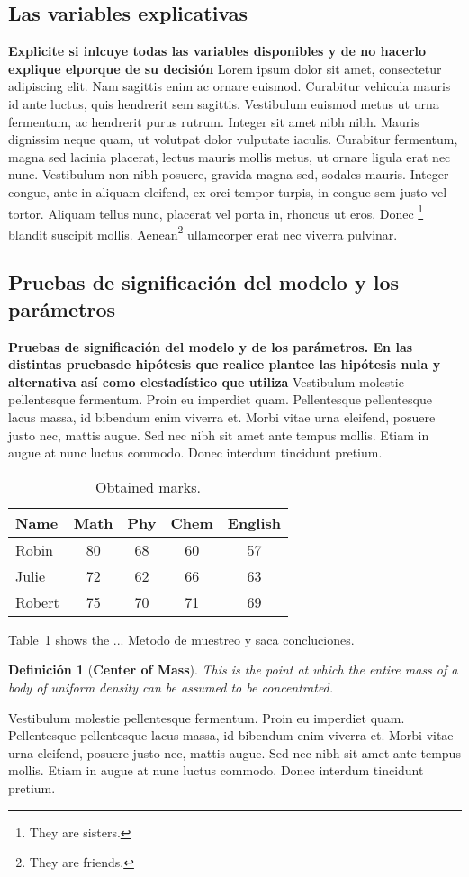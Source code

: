 \documentclass[a4paper,12pt,twocolumn]{article}
\newtheorem{dfn}{Definición}
\begin{document}
\subsection{Las variables explicativas }
\textbf{Explicite si inlcuye todas las variables disponibles y de no hacerlo explique elporque de su decisión} 
Lorem ipsum dolor sit amet, consectetur adipiscing elit. Nam sagittis enim ac ornare euismod. Curabitur vehicula mauris id ante luctus, quis hendrerit sem sagittis. Vestibulum euismod metus ut urna fermentum, ac hendrerit purus rutrum. Integer sit amet nibh nibh. Mauris dignissim neque quam, ut volutpat dolor vulputate iaculis. Curabitur fermentum, magna sed lacinia placerat, lectus mauris mollis metus, ut ornare ligula erat nec nunc. Vestibulum non nibh posuere, gravida magna sed, sodales mauris. Integer congue, ante in aliquam eleifend, ex orci tempor turpis, in congue sem justo vel tortor. Aliquam tellus nunc, placerat vel porta in, rhoncus ut eros. Donec \footnote{They are sisters.} blandit suscipit mollis. Aenean\footnote{They are
friends.\label{fn:friends}} ullamcorper erat nec viverra pulvinar. 
\subsection{Pruebas de significación del modelo y los parámetros }
\textbf{Pruebas de significación del modelo y de los parámetros. En las distintas pruebasde hipótesis que  realice plantee las hipótesis nula y alternativa  así  como  elestadístico que utiliza}
Vestibulum molestie pellentesque fermentum. Proin eu imperdiet quam. Pellentesque pellentesque lacus massa, id bibendum enim viverra et. Morbi vitae urna eleifend, posuere justo nec, mattis augue. Sed nec nibh sit amet ante tempus mollis. Etiam in augue at nunc luctus commodo. Donec interdum tincidunt pretium. 
\begin{table}[!hbt]
\centering
\caption{Obtained marks.}
\label{tab-marks}
\begin{tabular}{|l|c|c|c|c|}
\hline Name & Math & Phy & Chem & English\\
\hline Robin & 80 & 68 & 60 & 57\\
\hline Julie & 72 & 62 & 66 & 63\\
\hline Robert & 75 & 70 & 71 & 69\\
\hline
\end{tabular}
\end{table}
%
Table~\ref{tab-marks} shows the ...
Metodo de muestreo y saca concluciones. 

\begin{dfn}[\bf Center of Mass]\label{dfn-cm}
This is the point at which the entire mass of
a body of uniform density can be assumed to
be concentrated.
\end{dfn}
Vestibulum molestie pellentesque fermentum. Proin eu imperdiet quam. Pellentesque pellentesque lacus massa, id bibendum enim viverra et. Morbi vitae urna eleifend, posuere justo nec, mattis augue. Sed nec nibh sit amet ante tempus mollis. Etiam in augue at nunc luctus commodo. Donec interdum tincidunt pretium. 
\end{document}
